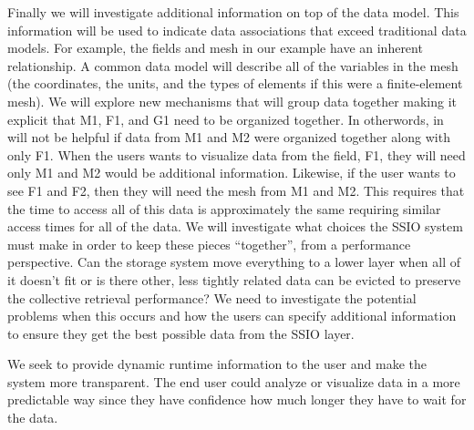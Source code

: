 Finally we will investigate additional information on top of the data model.
This information will be used to indicate data associations that exceed
traditional data models. For example, the fields and mesh in our example have
an inherent relationship. A common data model will describe all of the
variables in the mesh (the coordinates, the units, and the types of elements if
this were a finite-element mesh). We will explore new mechanisms that will
group data together making it explicit that M1, F1, and G1 need to be organized
together.  In otherwords, in will not be helpful if data from M1 and M2 were
organized together along with only F1. When the users wants to visualize data
from the field, F1, they will need only M1 and M2 would be additional
information. Likewise, if the user wants to see F1 and F2, then they will need
the mesh from M1 and M2. This requires that the time to access all of this
data is approximately the same requiring similar access times for all of the
data.  We will investigate what choices the SSIO system must make in order to
keep these pieces ``together'', from a performance perspective. Can the storage
system move everything to a lower layer when all of it doesn't fit or is there
other, less tightly related data can be evicted to preserve the collective
retrieval performance?  We need to investigate the potential problems when this
occurs and how the users can specify additional information to ensure they get
the best possible data from the SSIO layer.

We seek to provide dynamic runtime information to the user and make the
system more transparent. The end user could analyze or visualize data in a more
predictable way since they have confidence how much longer they have to wait
for the data.


